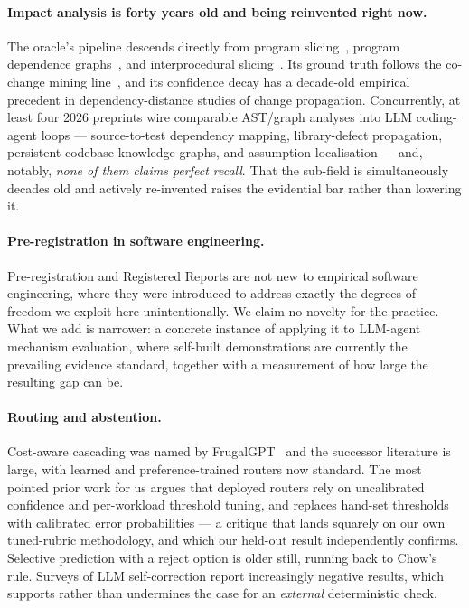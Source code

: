 \documentclass[sigconf,review,anonymous]{acmart}
\begin{document}
\paragraph{Impact analysis is forty years old and being reinvented right now.}
The oracle's pipeline descends directly from program slicing~\cite{weiser1984}, program dependence
graphs~\cite{ferrante1987}, and interprocedural slicing~\cite{horwitz1990}. Its ground truth follows
the co-change mining line~\cite{zimmermann2005,zimmermann2004}, and its confidence decay has a
decade-old empirical precedent in dependency-distance studies of change propagation. Concurrently,
at least four 2026 preprints wire comparable AST/graph analyses into LLM coding-agent loops ---
source-to-test dependency mapping, library-defect propagation, persistent codebase knowledge graphs,
and assumption localisation --- and, notably, \emph{none of them claims perfect recall}. That the
sub-field is simultaneously decades old and actively re-invented raises the evidential bar rather
than lowering it.

\paragraph{Pre-registration in software engineering.} Pre-registration and Registered Reports are not new
to empirical software engineering, where they were introduced to address exactly the degrees of freedom we
exploit here unintentionally. We claim no novelty for the practice. What we add is narrower: a concrete
instance of applying it to LLM-agent mechanism evaluation, where self-built demonstrations are currently the
prevailing evidence standard, together with a measurement of how large the resulting gap can be.

\paragraph{Routing and abstention.} Cost-aware cascading was named by
FrugalGPT~\cite{chen2023} and the successor literature is large, with learned and preference-trained
routers now standard. The most pointed prior work for us argues that deployed routers rely on
uncalibrated confidence and per-workload threshold tuning, and replaces hand-set thresholds with
calibrated error probabilities --- a critique that lands squarely on our own tuned-rubric
methodology, and which our held-out result independently confirms. Selective prediction with a
reject option is older still, running back to Chow's rule. Surveys of LLM self-correction report
increasingly negative results, which supports rather than undermines the case for an
\emph{external} deterministic check.
\end{document}
